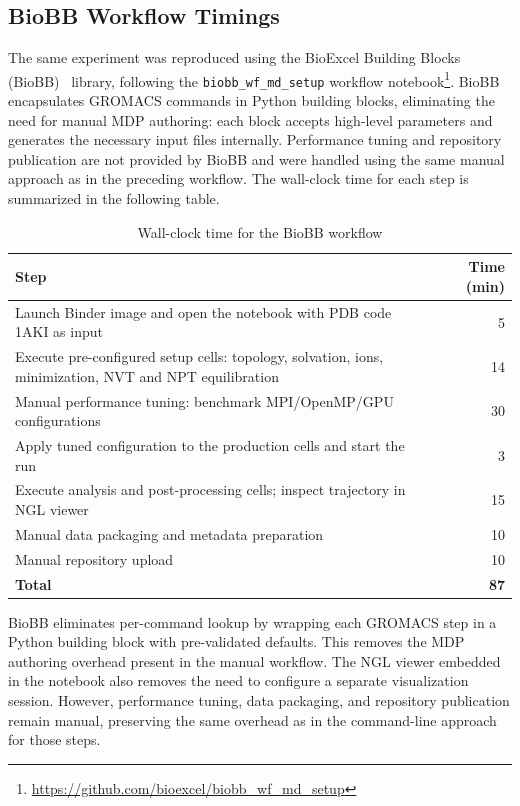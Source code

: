 \documentclass[
  digital,     %
  color,       %
  oneside,     %
  nosansbold,  %
  nocolorbold, %
  lof,         %
  lot,         %
]{fithesis4}
\begin{document}
\subsection{BioBB Workflow Timings}
\label{sec:biobb-timings}

The same experiment was reproduced using the BioExcel Building Blocks (BioBB)~\cite{BioBB} library, following the \texttt{biobb\_wf\_md\_setup} workflow notebook\footnote{\url{https://github.com/bioexcel/biobb_wf_md_setup}}. BioBB encapsulates GROMACS commands in Python building blocks, eliminating the need for manual MDP authoring: each block accepts high-level parameters and generates the necessary input files internally. Performance tuning and repository publication are not provided by BioBB and were handled using the same manual approach as in the preceding workflow. The wall-clock time for each step is summarized in the following table.

\begin{table}[H]
\caption{Wall-clock time for the BioBB workflow}
\label{tab:biobb-timings}
\begin{tabularx}{\linewidth}{Xr}
\hline
\textbf{Step} & \textbf{Time (min)} \\
\hline
Launch Binder image and open the notebook with PDB code 1AKI as input & 5 \\
Execute pre-configured setup cells: topology, solvation, ions, minimization, NVT and NPT equilibration & 14 \\
Manual performance tuning: benchmark MPI/OpenMP/GPU configurations & 30 \\
Apply tuned configuration to the production cells and start the run & 3 \\
Execute analysis and post-processing cells; inspect trajectory in NGL viewer & 15 \\
Manual data packaging and metadata preparation & 10 \\
Manual repository upload & 10 \\
\hline
\textbf{Total} & \textbf{87} \\
\hline
\end{tabularx}
\end{table}

BioBB eliminates per-command lookup by wrapping each GROMACS step in a Python building block with pre-validated defaults. This removes the MDP authoring overhead present in the manual workflow. The NGL viewer embedded in the notebook also removes the need to configure a separate visualization session. However, performance tuning, data packaging, and repository publication remain manual, preserving the same overhead as in the command-line approach for those steps.
\end{document}
